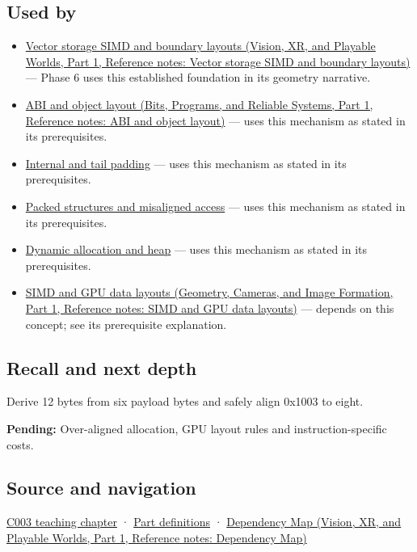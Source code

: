 \subsection{Used by}\label{appendix-a1f7c53b4742-used-by}

\hypertarget{appendix-a1f7c53b4742-used-by}{}

\begin{itemize}
\item
  \href{../07-Vision-XR-and-Playable-Worlds-P01/main.pdf\#nameddest=appendix-26bf6bf2fb8b}{Vector storage SIMD and boundary layouts (Vision, XR, and Playable Worlds, Part 1, Reference notes: Vector storage SIMD and boundary layouts)} --- Phase 6 uses this established foundation in its geometry narrative.
\item
  \href{../01-Bits-Programs-and-Reliable-Systems-P01/main.pdf\#nameddest=appendix-c4ac6bb0fff8}{ABI and object layout (Bits, Programs, and Reliable Systems, Part 1, Reference notes: ABI and object layout)} --- uses this mechanism as stated in its prerequisites.
\item
  \hyperref[appendix-f52f8c5a3afd]{Internal and tail padding} --- uses this mechanism as stated in its prerequisites.
\item
  \hyperref[appendix-0682dbfc5f0e]{Packed structures and misaligned access} --- uses this mechanism as stated in its prerequisites.
\item
  \hyperref[appendix-c3480f7d9ff3]{Dynamic allocation and heap} --- uses this mechanism as stated in its prerequisites.
\item
  \href{../03-Geometry-Cameras-and-Image-Formation-P01/main.pdf\#nameddest=appendix-3c7b1a56de01}{SIMD and GPU data layouts (Geometry, Cameras, and Image Formation, Part 1, Reference notes: SIMD and GPU data layouts)} --- depends on this concept; see its prerequisite explanation.
\end{itemize}

\subsection{Recall and next depth}\label{appendix-a1f7c53b4742-recall-and-next-depth}

\hypertarget{appendix-a1f7c53b4742-recall-and-next-depth}{}

Derive 12 bytes from six payload bytes and safely align 0x1003 to eight.

\textbf{Pending:} Over-aligned allocation, GPU layout rules and instruction-specific costs.

\subsection{Source and navigation}\label{appendix-a1f7c53b4742-source-and-navigation}

\hypertarget{appendix-a1f7c53b4742-source-and-navigation}{}

\hyperref[01-foundations-i-ch002-where-the-bytes-live]{C003 teaching chapter} · \hyperref[appendix-fd090d982a15-m003---parts-41-60]{Part definitions} · \href{../07-Vision-XR-and-Playable-Worlds-P01/main.pdf\#nameddest=appendix-4ad47bdd269a}{Dependency Map (Vision, XR, and Playable Worlds, Part 1, Reference notes: Dependency Map)}
